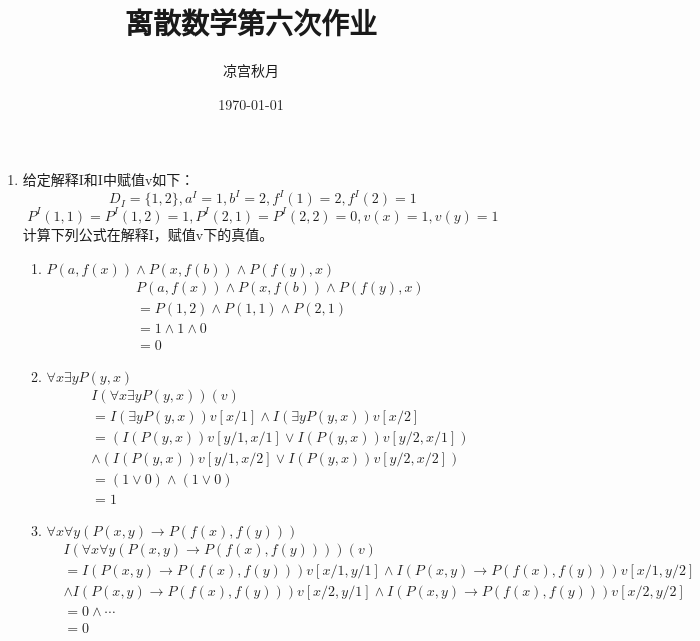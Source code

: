 \documentclass[UTF8]{ctexart}
\title{离散数学第六次作业}
\author{凉宫秋月}
\date{\today}
\begin{document}
    \maketitle
    \begin{enumerate}
        \item 给定解释I和I中赋值v如下：
        \[
            D_I=\{ 1,2\},a^I=1,b^I=2,f^I(1)=2,f^I(2)=1
        \]
        \[
            P^I(1,1)=P^I(1,2)=1,P^I(2,1)=P^I(2,2)=0,v(x)=1,v(y)=1
        \]
        计算下列公式在解释I，赋值v下的真值。
        \begin{enumerate}
            \item $P(a, f (x)) \wedge P(x, f (b)) \wedge P( f ( y), x)$
            \[
                \begin{aligned}
                    &P(a, f (x)) \wedge P(x, f (b)) \wedge P( f ( y), x)\\
                    &=P(1,2)\wedge P(1,1) \wedge P(2,1)\\
                    &=1\wedge 1\wedge 0\\
                    &=0
                \end{aligned}
            \]
            \item $\forall x \exists yP( y, x)$
            \[
                \begin{aligned}
                    &I(\forall x \exists yP( y, x))(v)\\
                    &=I(\exists yP(y,x))v[x/1] \wedge I(\exists yP(y,x))v[x/2]\\
                    &=(I(P(y,x))v[y/1,x/1] \vee I(P(y,x))v[y/2,x/1])\\
                    &\wedge (I(P(y,x))v[y/1,x/2] \vee I(P(y,x))v[y/2,x/2])\\
                    &=(1\vee 0)\wedge (1\vee 0)\\
                    &=1
                \end{aligned}
            \]
            \item $\forall x\forall y(P(x, y) \rightarrow P( f (x), f (y)))$
            \[
                \begin{aligned}
                    &I(\forall x\forall y(P(x, y) \rightarrow P( f (x), f (y))))(v)\\
                    &=I(P(x,y)\rightarrow P(f(x),f(y)))v[x/1,y/1]\wedge I(P(x,y)\rightarrow P(f(x),f(y)))v[x/1,y/2]\\
                    &\wedge I(P(x,y)\rightarrow P(f(x),f(y)))v[x/2,y/1] \wedge I(P(x,y)\rightarrow P(f(x),f(y)))v[x/2,y/2]\\
                    &=0\wedge \cdots\\
                    &=0 
                \end{aligned}
            \]
        \end{enumerate}
        

\end{enumerate}
\end{document}
